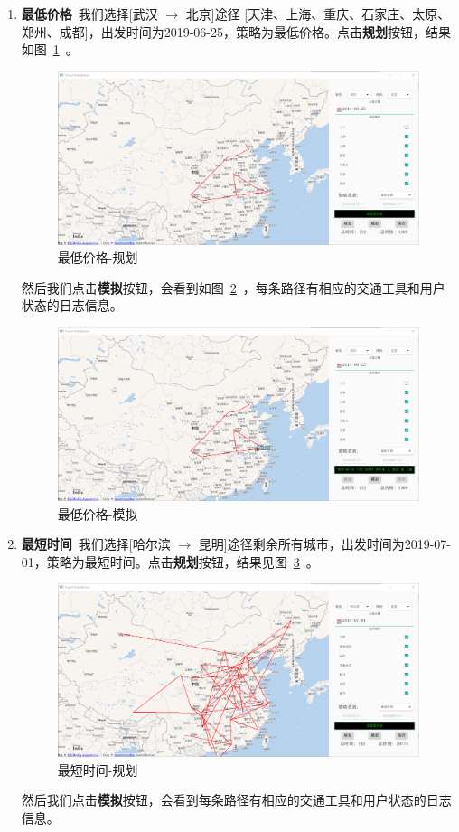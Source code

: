 \documentclass[lang=cn,blue,14pt]{elegantbook}
\begin{document}
\begin{enumerate}
	\item \textbf{最低价格}\ 我们选择[武汉 $\to$ 北京]途径 [天津、上海、重庆、石家庄、太原、郑州、成都]，出发时间为2019-06-25，策略为最低价格。点击\textbf{规划}按钮，结果如图~\ref{plan}~。
	
\begin{figure}[!htbp]
	\centering
	\includegraphics[width=.8\textwidth]{plan.png}
	\caption{最低价格-规划}
	\label{plan}
\end{figure}

然后我们点击\textbf{模拟}按钮，会看到如图~\ref{simu}~，每条路径有相应的交通工具和用户状态的日志信息。

\begin{figure}[!htbp]
	\centering
	\includegraphics[width=.8\textwidth]{simulation.png}
	\caption{最低价格-模拟}
	\label{simu}
\end{figure}

	\item \textbf{最短时间}\ 我们选择[哈尔滨 $\to$ 昆明]途径剩余所有城市，出发时间为2019-07-01，策略为最短时间。点击\textbf{规划}按钮，结果见图~\ref{fastest}~。
\begin{figure}[!htbp]
	\centering
	\includegraphics[width=.8\textwidth]{fastest.png}
	\caption{最短时间-规划}
	\label{fastest}
\end{figure}
然后我们点击\textbf{模拟}按钮，会看到每条路径有相应的交通工具和用户状态的日志信息。


\end{enumerate}
\end{document}
